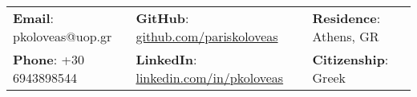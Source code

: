 %
\vspace{0.5cm} 
\begin{center}
    \begin{tabular}{lll}
        \textbf{Email}: pkoloveas@uop.gr      &
        \hspace{0.55in} \textbf{GitHub}: \href{https://github.com/pariskoloveas}{github.com/pariskoloveas}   & 
        \hspace{0.4in} 	\textbf{Residence}: Athens, GR \\

        \textbf{Phone}: +30 6943898544   & 
        \hspace{0.55in} \textbf{LinkedIn}: \href{https://www.linkedin.com/in/pkoloveas/}{linkedin.com/in/pkoloveas}    &
        \hspace{0.4in} \textbf{Citizenship}: Greek 
    \end{tabular}
\end{center}